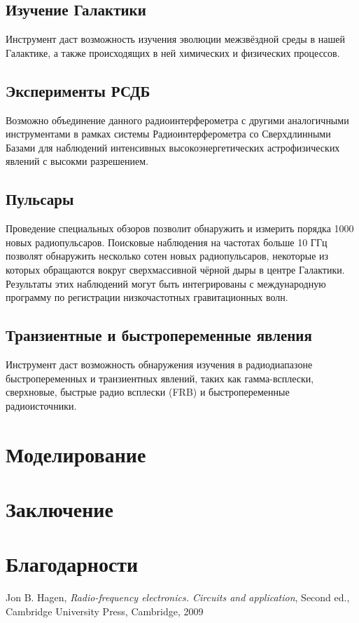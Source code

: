 \documentclass[10pt,a4paper]{article}
\begin{document}
\subsection{Изучение Галактики}
Инструмент даст возможность изучения эволюции межзвёздной среды в нашей Галактике, а также происходящих в ней химических и физических процессов.

\subsection{Эксперименты РСДБ}
Возможно объединение данного радиоинтерферометра с другими аналогичными инструментами в рамках системы Радиоинтерферометра со Сверхдлинными Базами для наблюдений интенсивных высокоэнергетических астрофизических явлений с высокми разрешением.

\subsection{Пульсары}
Проведение специальных обзоров позволит обнаружить и измерить порядка 1000 новых радиопульсаров. Поисковые наблюдения на частотах больше 10 ГГц позволят обнаружить несколько сотен новых радиопульсаров, некоторые из которых обращаются вокруг сверхмассивной чёрной дыры в центре Галактики. Результаты этих наблюдений могут быть интегрированы с международную программу по регистрации низкочастотных гравитационных волн.

\subsection{Транзиентные и быстропеременные явления}
Инструмент даст возможность обнаружения изучения в радиодиапазоне быстропеременных и транзиентных явлений, таких как гамма-всплески, сверхновые, быстрые радио всплески (FRB) и быстропеременные радиоисточники.

\section{Моделирование}

\section{Заключение}

\section*{Благодарности}

\begin{thebibliography}{1}
 Jon B. Hagen, {\em Radio-frequency electronics. Circuits and application}, Second ed., Cambridge University Press, Cambridge, 2009 %

\end{thebibliography}
\end{document}
